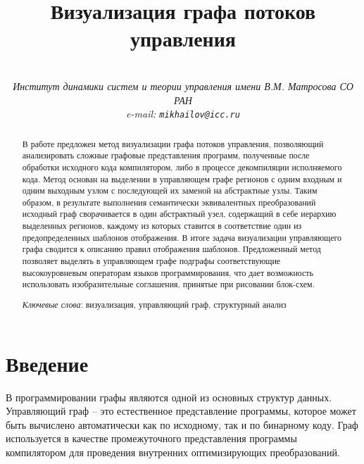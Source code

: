 \documentclass{jctart15a}
\begin{document}
     \setcounter{page}{1}


     \title{Визуализация графа потоков управления
						}

     \author{\\
						\it{Институт динамики систем и теории управления имени В.М. Матросова СО РАН}\\
             e-mail: \tt{mikhailov@icc.ru}}

     \date{}

     \maketitle

     \begin{abstract}
		В работе предложен метод визуализации графа потоков управления, позволяющий анализировать сложные графовые представления  программ, полученные после обработки исходного кода компилятором, либо в процессе декомпиляции исполняемого кода. Метод основан на выделении в управляющем графе регионов с одним входным и одним выходным узлом с последующей их заменой на абстрактные узлы. Таким образом, в результате выполнения семантически эквивалентных преобразований исходный граф сворачивается в один абстрактный узел, содержащий в себе иерархию выделенных регионов, каждому из которых ставится в соответствие один из предопределенных шаблонов отображения. В итоге задача визуализации управляющего графа сводится к описанию правил отображения шаблонов. Предложенный метод позволяет выделять в управляющем графе подграфы соответствующие высокоуровневым операторам языков программирования, что дает возможность использовать изобразительные соглашения, принятые при рисовании блок-схем.

		 {\it Ключевые слова}: визуализация, управляющий граф, структурный анализ
     \end{abstract}


\section*{Введение}
В программировании графы являются одной из основных структур данных. Управляющий граф -- это естественное представление программы, которое может быть вычислено автоматически как по исходному, так и по бинарному коду. Граф используется в качестве промежуточного представления программы компилятором для проведения внутренних оптимизирующих преобразований.
\end{document}
